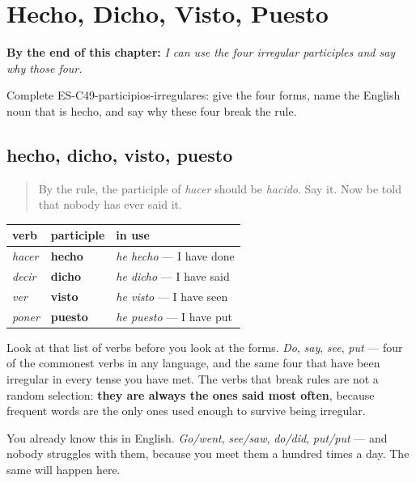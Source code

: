 
\chapter{Hecho, Dicho, Visto, Puesto}
\label{ch:irregular-participles}

\begin{chapteropening}
\textbf{By the end of this chapter:} \emph{I can use the four irregular participles and say why those four.}

Complete ES-C49-participios-irregulares: give the four forms, name the English noun that is hecho, and say why these four break the rule.
\end{chapteropening}

\section[hecho · dicho · visto · puesto]{hecho, dicho, visto, puesto}

\label{lesson:ES-C49-participios-irregulares}



\begin{quote}
By the rule, the participle of \emph{hacer} should be \emph{hacido}. Say it. Now be told that nobody has ever said it.
\end{quote}

\begin{grammarlens}[title={Grammar Lens: four, and you could have guessed which}]
\noindent
\begin{tabularx}{\linewidth}{@{}>{\raggedright\arraybackslash}X>{\raggedright\arraybackslash}X>{\raggedright\arraybackslash}X@{}}
\toprule
\textbf{verb} & \textbf{participle} & \textbf{in use} \\
\midrule
\emph{hacer} & \textbf{hecho} & \emph{he hecho} — I have done \\
\emph{decir} & \textbf{dicho} & \emph{he dicho} — I have said \\
\emph{ver} & \textbf{visto} & \emph{he visto} — I have seen \\
\emph{poner} & \textbf{puesto} & \emph{he puesto} — I have put \\
\bottomrule
\end{tabularx}

Look at that list of verbs before you look at the forms. \emph{Do}, \emph{say}, \emph{see}, \emph{put} — four of the commonest verbs in any language, and the same four that have been irregular in every tense you have met. The verbs that break rules are not a random selection: \textbf{they are always the ones said most often}, because frequent words are the only ones used enough to survive being irregular.

You already know this in English. \emph{Go/went}, \emph{see/saw}, \emph{do/did}, \emph{put/put} — and nobody struggles with them, because you meet them a hundred times a day. The same will happen here.
\end{grammarlens}

